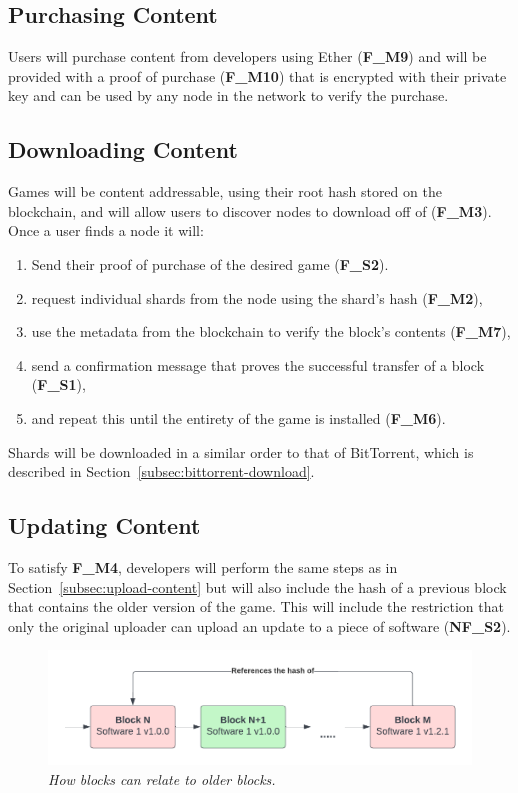 \subsection*{Purchasing Content}

Users will purchase content from developers using Ether (\textbf{F\_M9}) and will be provided with a proof of purchase (\textbf{F\_M10}) that is encrypted with their private key and can be used by any node in the network to verify the purchase.

\subsection*{Downloading Content}

Games will be content addressable, using their root hash stored on the blockchain, and will allow users to discover nodes to download off of (\textbf{F\_M3}). Once a user finds a node it will:

\begin{enumerate}
  \item Send their proof of purchase of the desired game (\textbf{F\_S2}).
  \item request individual shards from the node using the shard's hash (\textbf{F\_M2}),
  \item use the metadata from the blockchain to verify the block's contents (\textbf{F\_M7}),
  \item send a confirmation message that proves the successful transfer of a block (\textbf{F\_S1}), 
  \item and repeat this until the entirety of the game is installed (\textbf{F\_M6}).
\end{enumerate}

\noindent Shards will be downloaded in a similar order to that of BitTorrent, which is described in Section~\ref{subsec:bittorrent-download}.

\subsection*{Updating Content}

To satisfy \textbf{F\_M4}, developers will perform the same steps as in Section~\ref{subsec:upload-content} but will also include the hash of a previous block that contains the older version of the game. This will include the restriction that only the original uploader can upload an update to a piece of software (\textbf{NF\_S2}).

\begin{figure}[ht]
  \centering
  \includegraphics[width=.85\textwidth]{images/diagrams/update-software.png}
  \caption{\textit{How blocks can relate to older blocks.}}
\end{figure}

